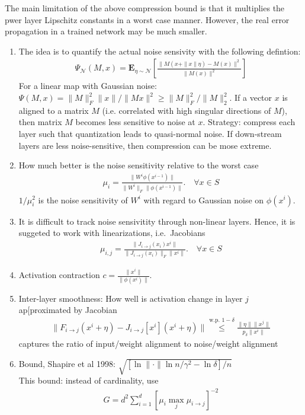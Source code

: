 \documentclass[12pt,a4paper]{article}
\newcommand{\E}{{\mathbf{E}}}
\begin{document}
The main limitation of the above compression bound is that it multiplies the pwer layer Lipschitz constants in a worst case manner. However, the real error propagation in a trained network may be much smaller. 
\begin{enumerate}
\item The idea is to quantify the actual noise sensivity with the following defintion:
\begin{align}
\Psi_{\mathcal N}(M,x) = \E_{\eta \sim \mathcal N} \left[ \frac{\| M(x + \|x\| \eta) - M(x)\|^2}{\| M(x) \|^2 }\right] 
\end{align}
For a linear map with Gaussian noise: $\Psi(M,x) = \|M\|^2_F \|x\| / \| Mx \|^2 \ge \|M\|^2_F/\|M\|^2_2 $. If a vector $x$ is aligned to a matrix $M$ (i.e. correlated with high singular directions of $M$), then matrix $M$ becomes less sensitive to noise at $x$. Strategy: compress each layer such that quantization leads to quasi-normal noise. If down-stream layers are less noise-sensitive, then compression can be mose extreme. 
%
\item How much better is the noise sensitivity relative to the worst case
\begin{align}
\mu_i  = \frac{\| W^i \phi(x^{i-1})\|}{\| W^i\|_F \| \phi(x^{i-1})\|}. \quad \forall x \in S
\end{align}
$1/\mu_i^2$ is the noise sensitivity of $W^i$ with regard to Gaussian noise on $\phi(x^i)$.
\item It is difficult to track noise sensivitity through non-linear layers. Hence, it is suggeted to work with linearizations, i.e.~Jacobians 
\begin{align}
\mu_{i,j} = \frac{\| J_{i \to j}(x_i) x^i \|}{\| J_{i \to j}(x_i)\|_F \| x^i\|}. \quad \forall x \in S
\end{align}
\item Activation contraction $c = \frac{ \| x^i \| }{ \| \phi ( x^i) \| }$.
\item Inter-layer smoothness: How well is activation change in layer $j$ ap[proximated by Jacobian
\begin{align}
\| F_{i \to j}(x^i + \eta) - J_{i \to j}[x^i] (x^i +\eta) \| \stackrel{\text{w.p.~$1-\delta$}}\le \frac{\| \eta\| \|x^j\|}{p_\delta \| x^i\|}
\end{align}
captures the ratio of input/weight alignment to noise/weight alignment
\item 
Bound, Shapire et al 1998: $\sqrt{ \left[ \ln \| \cdot \| \ln n / \gamma^2 - \ln \delta \right]/ n}$\\
This bound: instead of cardinality, use 
\begin{align}
G = d^2 \sum_{i=1}^d [\mu_i \max_j \mu_{i \to j}]^{-2}
\end{align}

\end{enumerate}





\end{document}
